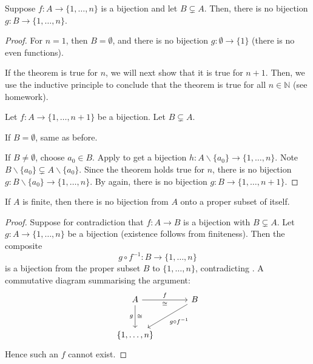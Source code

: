 \begin{theorem}\label{thm:finite-proper-subset-no-bijection}
  Suppose $f:A\to \{1,\ldots,n\}$ is a bijection and let $B\subsetneq A$. Then, there is no bijection \(g\colon B\to \{1,\ldots,n\}\).
\end{theorem}
\begin{proof}

  For $n=1$, then $B=\emptyset$, and there is no bijection \(g\colon \emptyset\to \{1\}\) (there is no even functions).

  If the theorem is true for $n$, we will next show that it is true for $n+1$. Then, we use the inductive principle to conclude that the theorem is true for all \(n\in\mathbb{N}\) (see homework).

  Let \(f\colon A\to \{1,\ldots,n+1\}\) be a bijection. Let \(B\subsetneq A\). 

  If $B=\emptyset$, same as before.

  If $B\neq \emptyset$, choose $a_0\in B$. Apply  to get a bijection $h:A\backslash \{a_0\}\to \{1,\ldots,n\}$. Note $B\backslash \{a_0\}\subsetneq A\backslash \{a_0\}$. Since the theorem holds true for $n$, there is no bijection \(g\colon B\backslash \{a_0\}\to \{1,\ldots,n\}\). By  again, there is no bijection \(g\colon B\to \{1,\ldots,n+1\}\).
\end{proof}

\begin{corollary}\label{cor:no-bijection-with-proper-subset}
  If $A$ is finite, then there is no bijection from $A$ onto a proper subset of itself.
\end{corollary}
\begin{proof}
  Suppose for contradiction that $f:A\to B$ is a bijection with $B\subsetneq A$. Let $g:A\to \{1,\ldots,n\}$ be a bijection (existence follows from finiteness). Then the composite
  \[
     g\circ f^{-1}: B \longrightarrow \{1,\ldots,n\}
  \]
  is a bijection from the proper subset $B$ to $\{1,\ldots,n\}$, contradicting .
  A commutative diagram summarising the argument:
  \[
  \begin{tikzcd}[row sep=large,column sep=large]
    A \arrow[r,"{f}","\cong"'] \arrow[d,"{g}"',"\cong"] & B \arrow[dl, "{g\circ f^{-1}}"] \\
    {\{1,\ldots,n\}}&
  \end{tikzcd}
  \]
  Hence such an $f$ cannot exist.
\end{proof}

